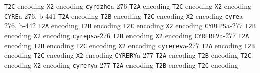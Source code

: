 \documentclass[twoside]{ltxdoc}
\makeatletter
\renewenvironment{theindex}{%
   \@restonecoltrue
   \if@twocolumn\@restonecolfalse\fi
   \columnseprule \z@
   \columnsep 35\p@
   \twocolumn[\index@prologue]%
   \IndexParms
   \let\item\@idxitem
   \ignorespaces
}{\if@restonecol\onecolumn\else\clearpage\fi}
\makeatother
\begin{document}
\begin{theindex}
    \subitem \texttt  {T2C} encoding\pfill {}
    \subitem \texttt  {X2} encoding\pfill {}
  \item \texttt  {cyrdzhe}\pfill a-276
    \subitem \texttt  {T2A} encoding\pfill {}
    \subitem \texttt  {T2C} encoding\pfill {}
    \subitem \texttt  {X2} encoding\pfill {}
  \item \texttt  {CYRE}\pfill a-276, b-441
    \subitem \texttt  {T2A} encoding\pfill {}
    \subitem \texttt  {T2B} encoding\pfill {}
    \subitem \texttt  {T2C} encoding\pfill {}
    \subitem \texttt  {X2} encoding\pfill {}
  \item \texttt  {cyre}\pfill a-276, b-442
    \subitem \texttt  {T2A} encoding\pfill {}
    \subitem \texttt  {T2B} encoding\pfill {}
    \subitem \texttt  {T2C} encoding\pfill {}
    \subitem \texttt  {X2} encoding\pfill {}
  \item \texttt  {CYREPS}\pfill a-277
    \subitem \texttt  {T2B} encoding\pfill {}
    \subitem \texttt  {X2} encoding\pfill {}
  \item \texttt  {cyreps}\pfill a-276
    \subitem \texttt  {T2B} encoding\pfill {}
    \subitem \texttt  {X2} encoding\pfill {}
  \item \texttt  {CYREREV}\pfill a-277
    \subitem \texttt  {T2A} encoding\pfill {}
    \subitem \texttt  {T2B} encoding\pfill {}
    \subitem \texttt  {T2C} encoding\pfill {}
    \subitem \texttt  {X2} encoding\pfill {}
  \item \texttt  {cyrerev}\pfill a-277
    \subitem \texttt  {T2A} encoding\pfill {}
    \subitem \texttt  {T2B} encoding\pfill {}
    \subitem \texttt  {T2C} encoding\pfill {}
    \subitem \texttt  {X2} encoding\pfill {}
  \item \texttt  {CYRERY}\pfill a-277
    \subitem \texttt  {T2A} encoding\pfill {}
    \subitem \texttt  {T2B} encoding\pfill {}
    \subitem \texttt  {T2C} encoding\pfill {}
    \subitem \texttt  {X2} encoding\pfill {}
  \item \texttt  {cyrery}\pfill a-277
    \subitem \texttt  {T2A} encoding\pfill {}
    \subitem \texttt  {T2B} encoding\pfill {}
    \subitem \texttt  {T2C} encoding\pfill {}

\end{theindex}
\end{document}
